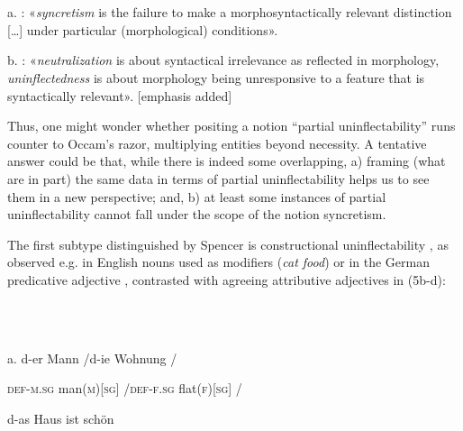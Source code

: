 \documentclass[output=paper]{langscibook}
\begin{document}
\begin{styleTabellaLUNGA}
\ea%
    \label{ex:key:4}
    \gll \\
         \\
    \glt
    \z %

          a.  \citet[2]{BaermanEtAl2005}: «\textit{syncretism} is the failure to make a morphosyntactically relevant distinction […] under particular (morphological) conditions».
\end{styleTabellaLUNGA}

\begin{styleTabellaLUNGA}
  b.  \citet[32]{BaermanEtAl2005}: «\textit{neutralization} is about syntactical irrelevance as reflected in morphology, \textit{uninflectedness} is about morphology being unresponsive to a feature that is syntactically relevant». [emphasis added]
\end{styleTabellaLUNGA}

Thus, one might wonder whether positing a notion “partial uninflectability” runs counter to Occam’s razor, multiplying entities beyond necessity. A tentative answer could be that, while there is indeed some overlapping, a) framing (what are in part) the same data in terms of partial uninflectability helps us to see them in a new perspective; and, b) at least some instances of partial uninflectability cannot fall under the scope of the notion syncretism.

The first subtype distinguished by Spencer is constructional uninflectability , as observed e.g. in English nouns used as modifiers (\textit{cat food}) or in the German predicative adjective , contrasted with agreeing attributive adjectives in (5b-d):

\begin{styleTabellaLUNGA}
\ea%
    \label{ex:key:5}
    \gll \\
         \\
    \glt
    \z %

          a.   d-er    Mann      /d-ie    Wohnung  /
\end{styleTabellaLUNGA}

\begin{styleTabellaLUNGA}
    \textsc{def-m.sg}  man(\textsc{m)[sg]}  /\textsc{def-f.sg}  flat(\textsc{f)[sg]}  /
\end{styleTabellaLUNGA}

\begin{styleTabellaLUNGA}
    d-as    Haus        ist      schön
\end{styleTabellaLUNGA}
\end{document}
